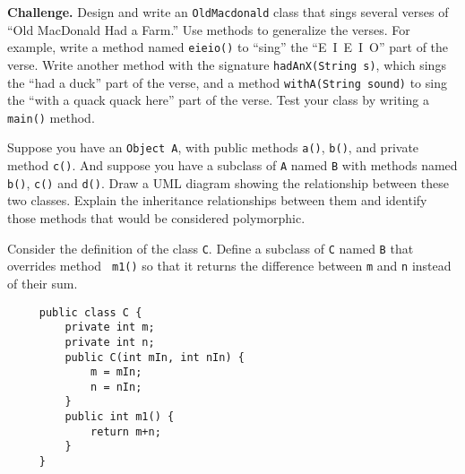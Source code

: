 \begin{EXRtwo}
\item  {\bf Challenge.} Design and write an {\tt OldMacdonald} class that
sings several verses of ``Old MacDonald Had a Farm.''  Use methods to
generalize the verses.  For example, write a method named {\tt eieio()}
to ``sing'' the \mbox{``E I E I O''} part of the verse.  Write another method
with the signature {\tt hadAnX(String s)}, which sings the ``had a
duck'' part of the verse, and a method {\tt withA(String sound)} to
sing the ``with a quack quack here'' part of the verse.   Test your
class by writing a {\tt main()} method.

\label{additional-exercises}

\item Suppose you have an {\tt Object A}, with public methods
{\tt a()}, {\tt b()}, and private method {\tt c()}. And suppose
you have a subclass of {\tt A} named {\tt B} with methods named
{\tt b()}, {\tt c()} and {\tt d()}. Draw a UML diagram showing the
relationship between these two classes. Explain the inheritance
relationships between them and identify those methods that would
be considered polymorphic.

\item Consider the definition of the class {\tt C}.
Define a subclass of {\tt C} named {\tt B} that overrides method {\tt
m1()} so that it returns the difference between {\tt m} and {\tt n}
instead of their sum.
\begin{jjjlisting}
\begin{lstlisting}
     public class C {
         private int m;
         private int n;
         public C(int mIn, int nIn) {
             m = mIn;
             n = nIn;
         }
         public int m1() {
             return m+n;
         }
     }
\end{lstlisting}
\end{jjjlisting}

\end{EXRtwo}


%


